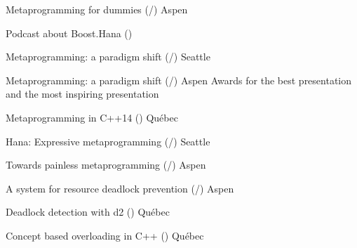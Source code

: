 \documentclass[10pt]{moderncv}
\newcommand{\myhref}[3][blue]{\href{#2}{\color{#1}{#3}}}
\begin{document}
        {Metaprogramming for dummies (\myhref{http://ldionne.github.io/cppnow-2016-metaprogramming-for-dummies}{slides}/\myhref{https://youtu.be/a1doqFAumCk}{video})}
        {\myhref{http://www.cppnow.org}{C++Now}}{Aspen}{}{}{}

        {Podcast about Boost.Hana (\myhref{http://cppcast.com/2016/04/louis-dionne/}{audio})}
        {\myhref{http://cppcast.com}{CppCast}}{}{}{}{}

        {Metaprogramming: a paradigm shift (\myhref{http://ldionne.github.io/hana-cppcon-2015}{slides}/\myhref{https://youtu.be/cg1wOINjV9U}{video})}
        {\myhref{http://cppcon.org}{CppCon}}{Seattle}{}{}{}

        {Metaprogramming: a paradigm shift (\myhref{http://ldionne.github.io/hana-cppnow-2015}{slides}/\myhref{http://youtu.be/Z2ABRaQiFHs}{video})}
        {\myhref{http://www.cppnow.org}{C++Now}}{Aspen}{}
        {Awards for the best presentation and the most inspiring presentation}

        {Metaprogramming in C++14 (\myhref{http://ldionne.github.io/hana-opencode-xxii}{french only slides})}
        {\myhref{http://www.opencode.ca}{OpenCode XXII}}{Québec}{}{}

        {Hana: Expressive metaprogramming (\myhref{http://ldionne.github.io/hana-cppcon-2014/}{slides}/\myhref{https://www.youtube.com/watch?v=L2SktfaJPuU}{video})}
        {\myhref{http://cppcon.org}{CppCon}}{Seattle}{}{}

        {Towards painless metaprogramming (\myhref{http://ldionne.github.io/mpl11-cppnow-2014}{slides}/\myhref{https://www.youtube.com/watch?v=8c0aWLuEO0Y}{video})}
        {\myhref{http://www.cppnow.org}{C++Now}}{Aspen}{}{}

        {A system for resource deadlock prevention (\myhref{http://ldionne.github.io/d2-cppnow-2013}{slides}/\myhref{https://www.youtube.com/watch?v=Re67U4zAN-M}{video})}
        {\myhref{http://www.cppnow.org}{C++Now}}{Aspen}{}{}

        {Deadlock detection with d2 (\myhref{http://ldionne.github.io/d2-opencode12}{slides})}
        {\myhref{http://www.opencode.ca}{OpenCode XII}}{Québec}{}{}

        {Concept based overloading in C++ (\myhref{http://docs.google.com/presentation/d/1HpjEz6dJauNoBxMGWzaNuOOoiVwqgISTNWNTwuOo-_8/edit?usp=sharing}{slides})}
        {\myhref{http://www.opencode.ca}{OpenCode IX}}{Québec}{}{}
\end{document}
